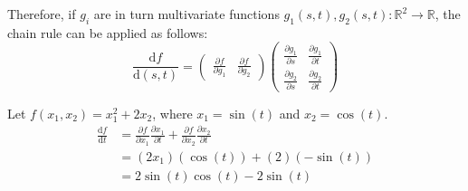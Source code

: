 \begin{description}
        Therefore, if $g_i$ are in turn multivariate functions $g_1(s, t), g_2(s, t): \mathbb{R}^2 \rightarrow \mathbb{R}$,
        the chain rule can be applied as follows:
        \[
            \frac{\text{d}f}{\text{d}(s, t)} = 
            \begin{pmatrix}
                \frac{\partial f}{\partial g_1} & \frac{\partial f}{\partial g_2}
            \end{pmatrix}
            \begin{pmatrix}
                \frac{\partial g_1}{\partial s} & \frac{\partial g_1}{\partial t} \\ 
                \frac{\partial g_2}{\partial s} & \frac{\partial g_2}{\partial t}
            \end{pmatrix}
        \]

        \begin{example}
            Let $f(x_1, x_2) = x_1^2 + 2x_2$, where $x_1 = \sin(t)$ and $x_2 = \cos(t)$.
            \[
                \begin{split}
                    \frac{\text{d}f}{\text{d}t} & = 
                        \frac{\partial f}{\partial x_1}\frac{\partial x_1}{\partial t} + \frac{\partial f}{\partial x_2}\frac{\partial x_2}{\partial t} \\
                        & = (2x_1)(\cos(t)) + (2)(-\sin(t)) \\
                        & = 2\sin(t)\cos(t) - 2\sin(t)
                \end{split}
            \]
        \end{example}


\end{description}
